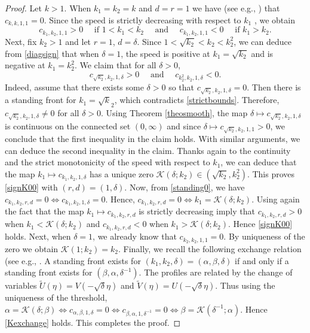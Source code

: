 \documentclass[11pt]{article}
\numberwithin{equation}{section}
\newcommand{\1}{\mathbbm{1}}
\numberwithin{equation}{section}
\theoremstyle{definition}
\def \K {\mathcal{K}}
\def \c{c_{k_1,k_2,r,d}}
\numberwithin{equation}{section}
\begin{document}
\begin{proof} Let $k>1$. When $k_1=k_2=k$ and $d=r=1$ we have (see e.g., \cite[Theorem 1.1]{guo2013}) that
	$c_{k,k,1,1}=0$. Since the speed is strictly decreasing with respect to $k_1$ \cite{kan1995}, we obtain 
	\begin{equation}\label{diagsign}
		c_{k_1,k_2,1,1}>0\quad\text{ if }1<k_1<k_2  \quad \text{ and }
		\quad c_{k_1,k_2,1,1}<0\quad\text{ if }k_1>k_2.
	\end{equation}
	Next, fix $k_2>1$ and let $r=1$, $d=\delta$. Since $1<\sqrt{k_2}<k_2<k_2^2$,  we can deduce from \eqref{diagsign} that when $\delta=1$, the speed is positive at $k_1=\sqrt{k_2}$ and  is negative at $k_1=k_2^2$. We claim that for all $\delta>0$, 
\begin{equation*}
	c_{\sqrt{k_2},k_2,1,\delta}>0  \quad \text{ and }
	\quad c_{k_2^2,k_2,1,\delta}<0.
\end{equation*}
Indeed, assume that there exists some $\delta>0$ so that $c_{\sqrt{k_2},k_2,1,\delta}=0$. Then there is a standing front for $k_1=\sqrt{k}_2$, which contradicts \eqref{strictbounds}. Therefore,  $c_{\sqrt{k_2},k_2,1,\delta}\neq 0$ for all $\delta>0$. Using Theorem \ref{theosmooth}, the map $\delta \mapsto c_{\sqrt{k_2},k_2,1,\delta}$ is continuous on the connected set $(0,\infty)$ and since $\delta \mapsto c_{\sqrt{k_2},k_2,1,1}>0$, we conclude that the first inequality in the claim holds. With similar arguments, we can deduce the second inequality in the claim. Thanks again to the continuity and the strict monotonicity of the speed with respect to $k_1$, we can deduce  that the map $k_1\mapsto c_{k_1,k_2,1,\delta}$ has a unique zero $\K(\delta;k_2)\in(\sqrt{k_2},k_2^2)$. This proves \eqref{signK00} with $(r,d)=(1,\delta)$. Now, from \eqref{standing0}, we have $\c=0  \Longleftrightarrow c_{k_1, k_2, 1, \delta}=0$. Hence, $\c=0  \Longleftrightarrow k_1=\K(\delta ; k_2)$. Using again the fact that the map $k_1\mapsto \c$ is strictly decreasing imply that  $\c>0$ when $k_1<\K(\delta ; k_2)$ and $\c<0$ when  $k_1>\K(\delta ; k_2)$. Hence \eqref{signK00} holds. 
Next, when $\delta=1$, we already know that $c_{k_2, k_2, 1,1}=0$. By uniqueness of the zero we obtain $\K(1 ; k_2)=k_2$. Finally, we recall the following exchange relation (see e.g., \cite{ ma2019, nakamura2026}. A standing front exists for $(k_1,k_2,\delta)=(\alpha,\beta,\delta)$ if and only if  a standing front exists for $(\beta, \alpha,\delta^{-1})$. The profiles are related by the change of variables $\tilde{U}(\eta)=V(-\sqrt{\delta}\eta)$ and $\tilde{V}(\eta)=U(-\sqrt{\delta}\eta)$.   Thus using the uniqueness of the threshold, $\alpha=\K(\delta;\beta) \Longleftrightarrow c_{\alpha, \beta, 1, \delta}=0\Longleftrightarrow c_{\beta,\alpha, 1, \delta^{-1}}=0 \Longleftrightarrow \beta=\K(\delta^{-1};\alpha)$. Hence \eqref{Kexchange} holds. This completes the proof.
\end{proof}
\end{document}

